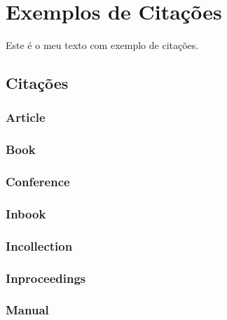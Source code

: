 \chapter{Exemplos de Citações}

Este é o meu texto com exemplo de citações.

\section{Citações}

\subsection{Article}

\cite{albuquerque2011}
\cite{shaikh2005}

\subsection{Book}

\cite{barron1991}
\cite{davenport1998}
\cite{dewey1980}
\cite{doxiadis1965}

\subsection{Conference}

\cite{unesco2003}

\subsection{Inbook}

\cite{guarino1995}

\subsection{Incollection}

\cite{bates2010}

\subsection{Inproceedings}

\cite{banks1991}
\cite{masolo2010}

\subsection{Manual}

\cite{EIA649B}

